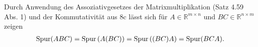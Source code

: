 \documentclass[main.tex]{subfiles}
\begin{document}
Durch Anwendung des Assoziativgesetzes der Matrixmultiplikation (Satz 4.59 Abs. 1) und der Kommutativität aus 8c lässt sich
für $A\in \mathbb{R}^{m\times n}$ und $BC\in \mathbb{R}^{n\times m}$ zeigen
\begin{align*}
    \operatorname{Spur} (ABC) = \operatorname{Spur} \left(A(BC)\right) = \operatorname{Spur} \left((BC)A\right) = \operatorname{Spur} (BCA).
\end{align*}




\end{document}
